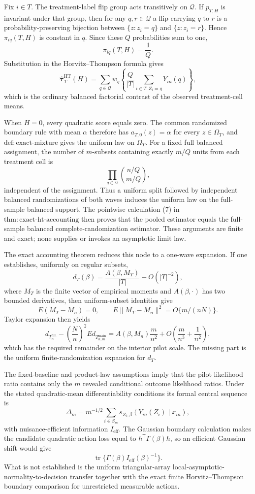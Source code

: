 Fix \(i\in T\).  The treatment-label flip group acts transitively on \(\mathcal Q\).  If \(p_{T,H}\) is invariant under that group, then for any \(q,r\in\mathcal Q\) a flip carrying \(q\) to \(r\) is a probability-preserving bijection between \(\{z:z_i=q\}\) and \(\{z:z_i=r\}\).  Hence \(\pi_{iq}(T,H)\) is constant in \(q\).  Since these \(Q\) probabilities sum to one,
\[
\pi_{iq}(T,H)=\frac1Q.
\]
Substitution in the Horvitz--Thompson formula gives
\[
\widehat{\boldsymbol\tau}^{\mathrm{HT}}_T(H)
=\sum_{q\in\mathcal Q}w_q
\left\{\frac Q{|T|}\sum_{i\in T:Z_i=q}Y_{in}(q)\right\},
\]
which is the ordinary balanced factorial contrast of the observed treatment-cell means.

When \(H=0\), every quadratic score equals zero.  The common randomized boundary rule with mean \(\alpha\) therefore has
\(a_{T,0}(z)=\alpha\) for every \(z\in\Omega_T\), and
\(\mathrm{def{:}exact\text{-}mixture}\) gives the uniform law on \(\Omega_T\).  For a fixed full balanced assignment, the number of \(m\)-subsets containing exactly \(m/Q\) units from each treatment cell is
\[
\prod_{q\in\mathcal Q}{n/Q\choose m/Q},
\]
independent of the assignment.  Thus a uniform split followed by independent balanced randomizations of both waves induces the uniform law on the full-sample balanced support.  The pointwise calculation (7) in
\(\mathrm{thm{:}exact\text{-}ht\text{-}accounting}\) then proves that the pooled estimator equals the full-sample balanced complete-randomization estimator.  These arguments are finite and exact; none supplies or invokes an asymptotic limit law.

The exact accounting theorem reduces this node to a one-wave expansion.  If one establishes, uniformly on regular subsets,
\[
d_T(\beta)=\frac{A(\beta,M_T)}{|T|}+O(|T|^{-2}),
\]
where \(M_T\) is the finite vector of empirical moments and \(A(\beta,\cdot)\) has two bounded derivatives, then uniform-subset identities give
\[
E(M_T-M_n)=0,
\qquad
E\|M_T-M_n\|^2=O\{m/(nN)\}.
\]
Taylor expansion then yields
\[
d_{T_n^{\mathrm{full}}}
-\left(\frac Nn\right)^2E d_{T_{n,m}^{\mathrm{main}}}
=A(\beta,M_n)\frac m{n^2}
+O\!\left(\frac m{n^3}+\frac1{n^2}\right),
\]
which has the required remainder on the interior pilot scale.  The missing part is the uniform finite-randomization expansion for \(d_T\).

The fixed-baseline and product-law assumptions imply that the pilot likelihood ratio contains only the \(m\) revealed conditional outcome likelihood ratios.  Under the stated quadratic-mean differentiability conditions its formal central sequence is
\[
\Delta_m=m^{-1/2}\sum_{i\in S_m}
s_{Z_i,\beta}(Y_{in}(Z_i)\mid x_{in}),
\]
with nuisance-efficient information \(I_{\mathrm{eff}}\).  The Gaussian boundary calculation makes the candidate quadratic action loss equal to
\(h^{\mathsf T}\Gamma(\beta)h\), so an efficient Gaussian shift would give
\[
\operatorname{tr}\{\Gamma(\beta)I_{\mathrm{eff}}(\beta)^{-1}\}.
\]
What is not established is the uniform triangular-array local-asymptotic-normality-to-decision transfer together with the exact finite Horvitz--Thompson boundary comparison for unrestricted measurable actions.

